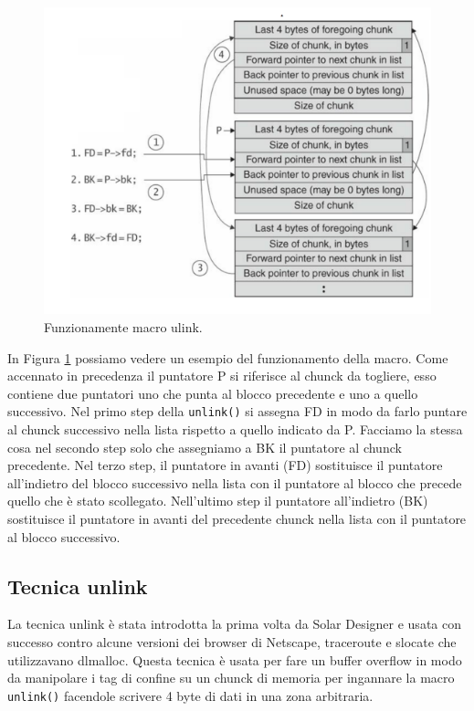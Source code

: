 \begin{figure}[H]
    \centering
    \includegraphics[width=12cm, keepaspectratio]{capitoli/secure_coding/img/cap_4/ulink.png}
    \caption{Funzionamente macro ulink.}\label{fig:ulink}
\end{figure}

In Figura \ref{fig:ulink} possiamo vedere un esempio del funzionamento della macro. Come accennato in precedenza il puntatore P si riferisce al chunck da togliere, esso contiene due puntatori uno che punta al blocco precedente e uno a quello successivo. Nel primo step della \verb|unlink()| si assegna FD in modo da farlo puntare al chunck successivo nella lista rispetto a quello indicato da P. Facciamo la stessa cosa nel secondo step solo che assegniamo a BK il puntatore al chunck precedente. Nel terzo step, il puntatore in avanti (FD)  sostituisce il puntatore all'indietro del blocco successivo nella lista con il puntatore al blocco che precede quello che è stato scollegato. Nell'ultimo step il puntatore all'indietro (BK) sostituisce il puntatore in avanti del precedente chunck nella lista con il puntatore al blocco successivo.

\subsection{Tecnica unlink}
La tecnica unlink è stata introdotta la prima volta da Solar Designer e usata con successo contro alcune versioni dei browser di Netscape, traceroute e slocate che utilizzavano dlmalloc. Questa tecnica è usata per fare un buffer overflow in modo da manipolare i tag di confine su un chunck di memoria per ingannare la macro \verb|unlink()| facendole scrivere 4 byte di dati in una zona arbitraria.

